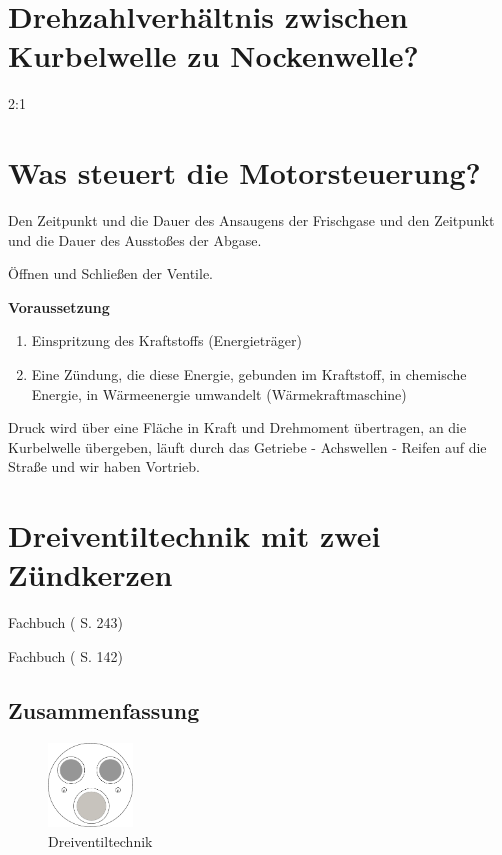 \section{Drehzahlverhältnis zwischen Kurbelwelle zu
Nockenwelle?}\label{drehzahlverhaeltnis-zwischen-kurbelwelle-zu-nockenwelle}

2:1

\section{Was steuert die
Motorsteuerung?}\label{was-steuert-die-motorsteuerung}

Den Zeitpunkt und die Dauer des Ansaugens der Frischgase und den
Zeitpunkt und die Dauer des Ausstoßes der Abgase.

Öffnen und Schließen der Ventile.

\textbf{Voraussetzung}

\begin{enumerate}
\item
  Einspritzung des Kraftstoffs (Energieträger)
\item
  Eine Zündung, die diese Energie, gebunden im Kraftstoff, in chemische
  Energie, in Wärmeenergie umwandelt (Wärmekraftmaschine)
\end{enumerate}

Druck wird über eine Fläche in Kraft und Drehmoment übertragen, an die
Kurbelwelle übergeben, läuft durch das Getriebe - Achswellen - Reifen
auf die Straße und wir haben Vortrieb.

\section{Dreiventiltechnik mit zwei
Zündkerzen}\label{dreiventiltechnik-mit-zwei-zuendkerzen}

Fachbuch (\textcite{brand:2020:fachkundeKfz} S. 243)

Fachbuch (\textcite{respondeck:2019:servicetechniker} S. 142)

\subsection{Zusammenfassung}\label{zusammenfassung}

\begin{figure}[!ht]%
\centering
\includegraphics[width=0.2\textwidth]{images/Skizze/05_Dreiventiltechnik_Skizze.pdf}
\caption{Dreiventiltechnik}
\end{figure}

